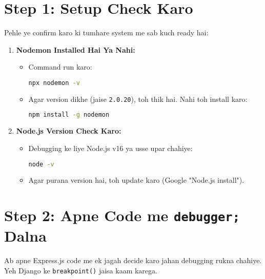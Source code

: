 \documentclass[a4paper,12pt]{article}
\begin{document}
\section{ Step 1: Setup Check Karo}
Pehle ye confirm karo ki tumhare system me sab kuch ready hai:  
\begin{enumerate}
    \item \textbf{\color{myblue}Nodemon Installed Hai Ya Nahi:}  
    \begin{itemize}
        \item Command run karo:  
        \begin{lstlisting}[language=Bash]
npx nodemon -v
        \end{lstlisting}
        \item Agar version dikhe (jaise \texttt{\color{mygreen}2.0.20}), toh thik hai. Nahi toh install karo:  
        \begin{lstlisting}[language=Bash]
npm install -g nodemon
        \end{lstlisting}
    \end{itemize}
    \item \textbf{\color{myblue}Node.js Version Check Karo:}  
    \begin{itemize}
        \item Debugging ke liye Node.js v16 ya usse upar chahiye:  
        \begin{lstlisting}[language=Bash]
node -v
        \end{lstlisting}
        \item Agar purana version hai, toh update karo (Google "Node.js install").
    \end{itemize}
\end{enumerate}

\section{Step 2: Apne Code me \texttt{\color{mygreen}debugger;} Dalna}
Ab apne Express.js code me ek jagah decide karo jahan debugging rukna chahiye. Yeh Django ke \texttt{\color{mygreen}breakpoint()} jaisa kaam karega.
\end{document}

